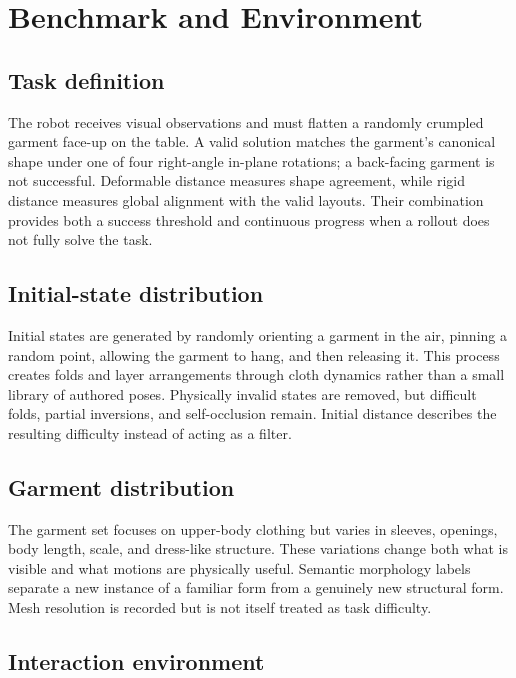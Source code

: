 \section{Benchmark and Environment}
\label{sec:benchmark}

\subsection{Task definition}

The robot receives visual observations and must flatten a randomly crumpled
garment face-up on the table. A valid solution matches the garment's canonical
shape under one of four right-angle in-plane rotations; a back-facing garment
is not successful. Deformable distance measures shape agreement, while rigid
distance measures global alignment with the valid layouts. Their combination
provides both a success threshold and continuous progress when a rollout does
not fully solve the task.

\subsection{Initial-state distribution}

Initial states are generated by randomly orienting a garment in the air,
pinning a random point, allowing the garment to hang, and then releasing it.
This process creates folds and layer arrangements through cloth dynamics rather
than a small library of authored poses. Physically invalid states are removed,
but difficult folds, partial inversions, and self-occlusion remain. Initial
distance describes the resulting difficulty instead of acting as a filter.

\subsection{Garment distribution}

The garment set focuses on upper-body clothing but varies in sleeves, openings,
body length, scale, and dress-like structure. These variations change both what
is visible and what motions are physically useful. Semantic morphology labels
separate a new instance of a familiar form from a genuinely new structural
form. Mesh resolution is recorded but is not itself treated as task difficulty.

\subsection{Interaction environment}

